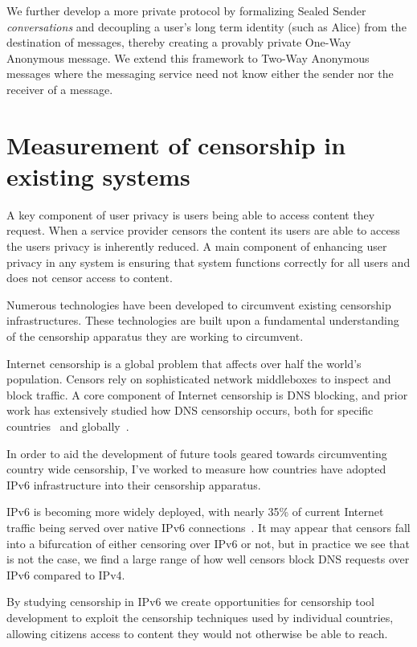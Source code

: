 We further develop a more private protocol by formalizing Sealed Sender
\emph{conversations} and decoupling a user's long term identity (such as Alice)
from the destination of messages, thereby creating a provably private One-Way
Anonymous message. We extend this framework to Two-Way Anonymous messages where
the messaging service need not know either the sender nor the receiver of a
message. 

\section{Measurement of censorship in existing systems}
A key component of user privacy is users being able to access content they
request. When a service provider censors the content its users are able to
access the users privacy is inherently reduced. A main component of enhancing
user privacy in any system is ensuring that system functions correctly for all
users and does not censor access to content.

Numerous technologies have been developed to circumvent existing censorship
infrastructures. These technologies are built upon a fundamental understanding
of the censorship apparatus they are working to circumvent. 

Internet censorship is a global problem that affects over half the world's
population. Censors rely on sophisticated network middleboxes to inspect and
block traffic. A core component of Internet censorship is DNS blocking, and
prior work has extensively studied how DNS censorship occurs, both for specific
countries~\cite{Anonymous2020:TripletCensors,USESEC21:GFWatch} and
globally~\cite{kuhrer2015going,dagon2008corrupted,pearce2017global,scott2016satellite}.

In order to aid the development of future tools geared towards circumventing
country wide censorship, I've worked to measure how countries have adopted IPv6
infrastructure into their censorship apparatus.

IPv6 is becoming more widely deployed, with nearly 35\% of current Internet
traffic being served over native IPv6 connections~\cite{Google-IPv6}. It may
appear that censors fall into a bifurcation of either censoring over IPv6 or
not, but in practice we see that is not the case, we find a large range of how
well censors block DNS requests over IPv6 compared to IPv4.

By studying censorship in IPv6 we create opportunities for censorship tool
development to exploit the censorship techniques used by individual countries,
allowing citizens access to content they would not otherwise be able to reach.

